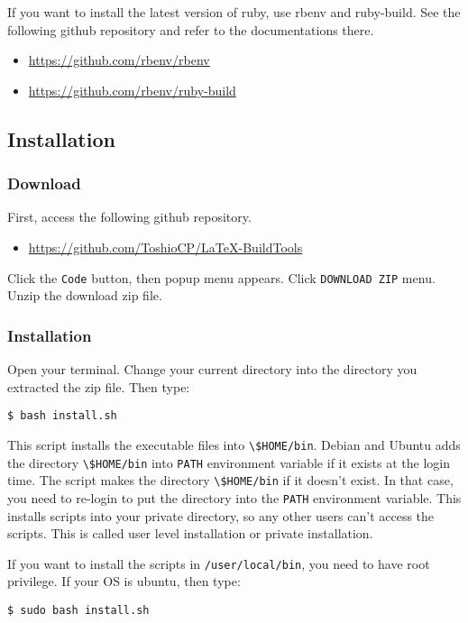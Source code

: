 If you want to install the latest version of ruby, use rbenv and ruby-build.
See the following github repository and refer to the documentations there.
\begin{itemize}
\item \url{https://github.com/rbenv/rbenv}
\item \url{https://github.com/rbenv/ruby-build}
\end{itemize}

\subsection{Installation}
\subsubsection{Download}
First, access the following github repository.
\begin{itemize}
\item \url{https://github.com/ToshioCP/LaTeX-BuildTools}
\end{itemize}
Click the \verb|Code| button, then popup menu appears.
Click \verb|DOWNLOAD ZIP| menu.
Unzip the download zip file.
\subsubsection{Installation}
Open your terminal.
Change your current directory into the directory you extracted the zip file. 
Then type:
\begin{verbatim}
$ bash install.sh
\end{verbatim}
This script installs the executable files into \verb|\$HOME/bin|.
Debian and Ubuntu adds the directory \verb|\$HOME/bin| into \verb|PATH| environment variable if it exists at the login time.
The script makes the directory \verb|\$HOME/bin| if it doesn't exist.
In that case, you need to re-login to put the directory into the \verb|PATH| environment variable.
This installs scripts into your private directory, so any other users can't access the scripts.
This is called user level installation or private installation.

If you want to install the scripts in \verb|/user/local/bin|, you need to have root privilege.
If your OS is ubuntu, then type:
\begin{verbatim}
$ sudo bash install.sh
\end{verbatim}

